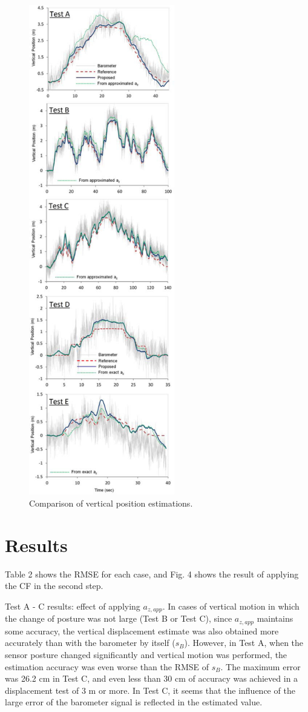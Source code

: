 \documentclass[10pt,journal,compsoc]{IEEEtran}
\begin{document}
\begin{figure}[!t]
\centering
\includegraphics[width=2.5in]{fig4}
\caption{Comparison of vertical position estimations.}
\label{fig4}
\end{figure}


\section{Results}

Table 2 shows the RMSE for each case, and Fig. 4 shows the result of applying
the CF in the second step.

Test A - C results: effect of applying $a_{z,app}$. In cases of vertical
motion in which the change of posture was not large (Test B or Test C),
since $a_{z,app}$ maintains some accuracy, the vertical displacement estimate
was also obtained more accurately than with the barometer by itself ($s_B$).
However, in Test A, when the sensor posture changed significantly and
vertical motion was performed, the estimation accuracy was even worse
than the RMSE of $s_B$. The maximum error was 26.2 cm in Test C, and
even less than 30 cm of accuracy was achieved in a displacement test of 3 m or
more. In Test C, it seems that the influence of the large error of the
barometer signal is reflected in the estimated value.
\end{document}
